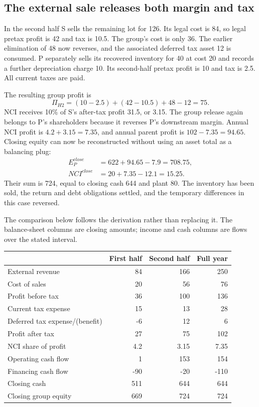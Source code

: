 \subsection{The external sale releases both margin and tax}

In the second half S sells the remaining lot for 126. Its legal cost is 84,
so legal pretax profit is 42 and tax is 10.5. The group's cost is only 36.
The earlier elimination of 48 now reverses, and the associated deferred tax
asset 12 is consumed. P separately sells its recovered inventory for 40 at
cost 20 and records a further depreciation charge 10. Its second-half pretax
profit is 10 and tax is 2.5. All current taxes are paid.

The resulting group profit is
\begin{equation}
 \Pi_{H2}=(10-2.5)+(42-10.5)+48-12=75.
 \label{eq:joined-h2-profit}
\end{equation}
NCI receives 10\% of S's after-tax profit 31.5, or 3.15. The group release
again belongs to P's shareholders because it reverses P's downstream margin.
Annual NCI profit is \(4.2+3.15=7.35\), and annual parent profit is
\(102-7.35=94.65\). Closing equity can now be reconstructed without using
an asset total as a balancing plug:
\begin{align}
 E_P^{close}&=622+94.65-7.9=708.75,\\
 NCI^{close}&=20+7.35-12.1=15.25.
\end{align}
Their sum is 724, equal to closing cash 644 and plant 80. The inventory has
been sold, the return and debt obligations settled, and the temporary
differences in this case reversed.

The comparison below follows the derivation rather than replacing it. The
balance-sheet columns are closing amounts; income and cash columns are flows
over the stated interval.
\begin{center}
\begin{tabular}{lrrr}
\toprule & First half & Second half & Full year\\\midrule
External revenue &84&166&250\\
Cost of sales &20&56&76\\
Profit before tax &36&100&136\\
Current tax expense &15&13&28\\
Deferred tax expense/(benefit) &-6&12&6\\
Profit after tax &27&75&102\\
NCI share of profit &4.2&3.15&7.35\\
Operating cash flow &1&153&154\\
Financing cash flow &-90&-20&-110\\
Closing cash &511&644&644\\
Closing group equity &669&724&724\\\bottomrule
\end{tabular}
\end{center}

